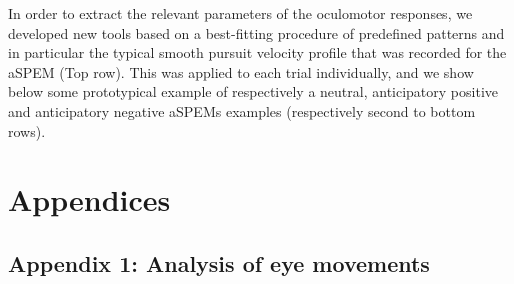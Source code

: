 \documentclass[12pt,english]{article}%
\begin{document}
In order to extract the relevant parameters of the oculomotor responses, we developed new tools based on a best-fitting procedure of predefined patterns and in particular the typical smooth pursuit velocity profile that was recorded for the aSPEM (Top row). This was applied to each trial individually, and we show below some prototypical example of respectively a neutral, anticipatory positive and anticipatory negative aSPEMs examples (respectively second to bottom rows).
\section{Appendices}
\subsection{Appendix 1: Analysis of eye movements}
\label{app:em}
\end{document}
